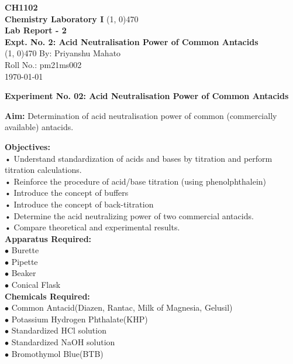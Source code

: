 \documentclass[12pt]{article}
\begin{document}
	\thispagestyle{empty}
	\begin{titlepage}
		\begin{center}
			\vspace{2cm}
			\huge\textbf{CH1102}\\
			\vspace{1cm}
			\large\textbf{Chemistry Laboratory I}
			\vfill
			\line(1, 0){470}\\[14pt]
			\huge\textbf{Lab Report - 2}\\[10pt]
			\Large\textbf{Expt. No. 2: Acid Neutralisation Power of Common Antacids}\\[14pt]
			\line(1, 0){470}
			\vfill
			By: Priyanshu Mahato\\
			Roll No.: pm21ms002\\
			\today
			
		\end{center}
	\end{titlepage}
	
	\setcounter{page}{1}
	
	\large\textbf{\centering Experiment No. 02: Acid Neutralisation Power of Common Antacids}
	
	\textbf{Aim: }Determination of acid neutralisation power of common (commercially available) antacids.
	
	\textbf{Objectives: }\\
	• Understand standardization of acids and bases by titration and perform titration calculations.\\
	• Reinforce the procedure of acid/base titration (using phenolphthalein)\\
	• Introduce the concept of buffers\\
	• Introduce the concept of back-titration\\
	• Determine the acid neutralizing power of two commercial antacids.\\
	• Compare theoretical and experimental results.\\
	
	\textbf{Apparatus Required: }\\
	$\bullet$ Burette\\
	$\bullet$ Pipette\\
	$\bullet$ Beaker\\
	$\bullet$ Conical Flask\\
	
	\textbf{Chemicals Required: }\\
	$\bullet$ Common Antacid(Diazen, Rantac, Milk of Magnesia, Gelusil)\\
	$\bullet$ Potassium Hydrogen Phthalate(KHP)\\
	$\bullet$ Standardized HCl solution\\
	$\bullet$ Standardized NaOH solution\\
	$\bullet$ Bromothymol Blue(BTB)\\
	
\end{document}
